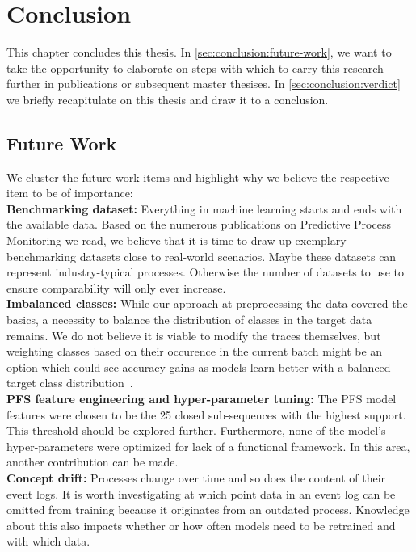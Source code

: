 \chapter{Conclusion} \label{chap:conclusion}
This chapter concludes this thesis. In \autoref{sec:conclusion:future-work}, we want to take the opportunity to elaborate on steps with which to carry this research further in publications or subsequent master thesises. In \autoref{sec:conclusion:verdict} we briefly recapitulate on this thesis and draw it to a conclusion.

\section{Future Work} \label{sec:conclusion:future-work}
We cluster the future work items and highlight why we believe the respective item to be of importance:\\

\noindent\textbf{Benchmarking dataset:} Everything in machine learning starts and ends with the available data. Based on the numerous publications on Predictive Process Monitoring we read, we believe that it is time to draw up exemplary benchmarking datasets close to real-world scenarios. Maybe these datasets can represent industry-typical processes. Otherwise the number of datasets to use to ensure comparability will only ever increase.\\

\noindent\textbf{Imbalanced classes:} While our approach at preprocessing the data covered the basics, a necessity to balance the distribution of classes in the target data remains. We do not believe it is viable to modify the traces themselves, but weighting classes based on their occurence in the current batch might be an option which could see accuracy gains as models learn better with a balanced target class distribution~\cite{web:stackoverflow-keras-class-weights}.\\

\noindent\textbf{PFS feature engineering and hyper-parameter tuning:} The PFS model features  were chosen to be the 25 closed sub-sequences with the highest support. This threshold should be explored further. Furthermore, none of the model's hyper-parameters were optimized for lack of a functional framework. In this area, another contribution can be made.\\

\noindent\textbf{Concept drift:} Processes change over time and so does the content of their event logs. It is worth investigating at which point data in an event log can be omitted from training because it originates from an outdated process. Knowledge about this also impacts whether or how often models need to be retrained and with which data.\\

